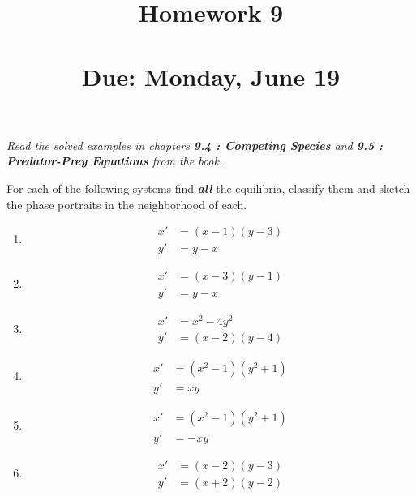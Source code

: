 
\usepackage{multicol}


\title{Homework 9\\ \hfill \\ Due: Monday, June 19}


\maketitle
\thispagestyle{fancy}






\emph{Read the solved examples in chapters \textbf{9.4 : Competing Species} and \textbf{9.5 : Predator-Prey Equations} from the book.}
\vspace{2em}



For each of the following systems find \textbf{\emph{all}} the equilibria, classify them and sketch the phase portraits in the neighborhood of each.
\vspace{2em}

\begin{multicols}{2}
	\begin{enumerate}[1. ]

		\item
		      \begin{align*}
		      	x' & = (x - 1)(y - 3) \\
		      	y' & = y - x
		      \end{align*}
		\item
		      \begin{align*}
		      	x' & = (x - 3)(y - 1) \\
		      	y' & = y - x
		      \end{align*}

		\item
		      \begin{align*}
		      	x' & = x^2 - 4y^2     \\
		      	y' & = (x - 2)(y - 4)
		      \end{align*}

		\item
		      \begin{align*}
		      	x' & =(x ^{2} - 1)(y ^{2}+1) \\
		      	y' & = xy
		      \end{align*}
		\item
		      \begin{align*}
		      	x' & =(x ^{2} - 1)(y ^{2}+1) \\
		      	y' & = -xy
		      \end{align*}
		\item
		      \begin{align*}
		      	x' & = (x-2)(y-3) \\
		      	y' & = (x+2)(y-2)
		      \end{align*}


	\end{enumerate}
\end{multicols}



